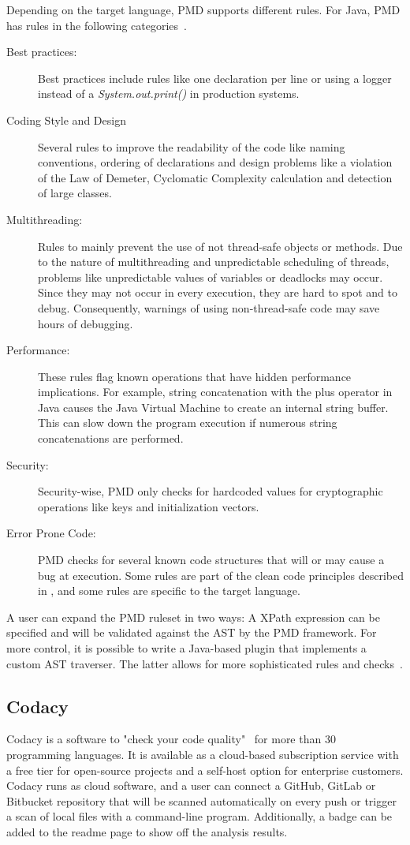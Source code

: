 Depending on the target language, PMD supports different rules. For Java, PMD has rules in the following categories~\cite{noauthor_documentation_nodate}.
\begin{description}
    \item[Best practices:] Best practices include rules like one declaration per line or using a logger instead of a \textit{System.out.print()} in production systems.  
    \item[Coding Style and Design] Several rules to improve the readability of the code like naming conventions, ordering of declarations and design problems like a violation of the Law of Demeter, Cyclomatic Complexity calculation and detection of large classes.
    \item[Multithreading:]  Rules to mainly prevent the use of not thread-safe objects or methods. Due to the nature of multithreading and unpredictable scheduling of threads, problems like unpredictable values of variables or deadlocks may occur. Since they may not occur in every execution, they are hard to spot and to debug. Consequently, warnings of using non-thread-safe code may save hours of debugging.
    \item[Performance:] These rules flag known operations that have hidden performance implications. For example, string concatenation with the plus operator in Java causes the Java Virtual Machine to create an internal string buffer. This can slow down the program execution if numerous string concatenations are performed.
    \item[Security:] Security-wise, PMD only checks for hardcoded values for cryptographic operations like keys and initialization vectors.
    \item[Error Prone Code:] PMD checks for several known code structures that will or may cause a bug at execution. Some rules are part of the clean code principles described in , and some rules are specific to the target language.
\end{description}

A user can expand the PMD ruleset in two ways: A XPath expression can be specified and will be validated against the AST by the PMD framework. For more control, it is possible to write a Java-based plugin that implements a custom AST traverser. The latter allows for more sophisticated rules and checks~\cite{noauthor_documentation_nodate}.

\subsection{Codacy}
Codacy is a software to "check your code quality"~\cite{noauthor_codacy_nodate} for more than 30 programming languages. It is available as a cloud-based subscription service with a free tier for open-source projects and a self-host option for enterprise customers.  Codacy runs as cloud software, and a user can connect a GitHub, GitLab or Bitbucket repository that will be scanned automatically on every push or trigger a scan of local files with a command-line program. Additionally, a badge can be added to the readme page to show off the analysis results.

